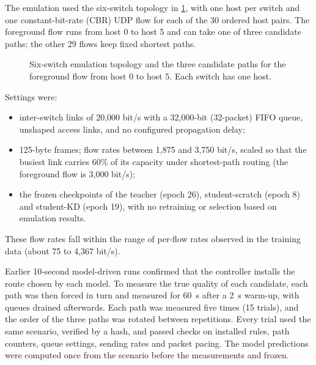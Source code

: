 The emulation used the six-switch topology in \cref{fig:mininet-topo}, with one host per switch and one constant-bit-rate (CBR) UDP flow for each of the 30 ordered host pairs. The foreground flow runs from host 0 to host 5 and can take one of three candidate paths; the other 29 flows keep fixed shortest paths.

\begin{figure}[htbp]
\centering
{}
\caption{Six-switch emulation topology and the three candidate paths for the foreground flow from host 0 to host 5. Each switch has one host.}
\label{fig:mininet-topo}
\end{figure}

\noindent Settings were:
\begin{itemize}
  \item inter-switch links of 20,000 bit/s with a 32,000-bit (32-packet) FIFO queue, unshaped access links, and no configured propagation delay;
  \item 125-byte frames; flow rates between 1,875 and 3,750 bit/s, scaled so that the busiest link carries 60\% of its capacity under shortest-path routing (the foreground flow is 3,000 bit/s);
  \item the frozen checkpoints of the teacher (epoch 26), student-scratch (epoch 8) and student-KD (epoch 19), with no retraining or selection based on emulation results.
\end{itemize}
These flow rates fall within the range of per-flow rates observed in the training data (about 75 to 4,367 bit/s).

Earlier 10-second model-driven runs confirmed that the controller installs the route chosen by each model. To measure the true quality of each candidate, each path was then forced in turn and measured for 60~s after a 2~s warm-up, with queues drained afterwards. Each path was measured five times (15 trials), and the order of the three paths was rotated between repetitions. Every trial used the same scenario, verified by a hash, and passed checks on installed rules, path counters, queue settings, sending rates and packet pacing. The model predictions were computed once from the scenario before the measurements and frozen.

